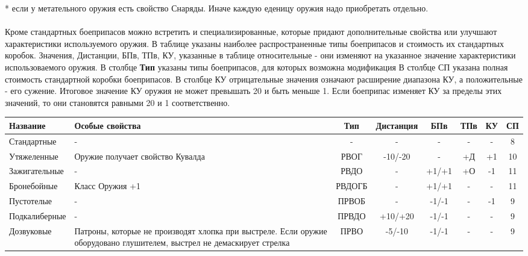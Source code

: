 * если у метательного оружия есть свойство Снаряды. Иначе каждую еденицу оружия надо приобретать отдельно.

\paragraph{} Кроме стандартных боеприпасов можно встретить и специализированные, которые придают дополнительные свойства или улучшают характеристики используемого оружия. В таблице указаны наиболее распространенные типы боеприпасов и стоимость их стандартных коробок.
\newline Значения, Дистанции, БПв, ТПв, КУ, указанные в таблице относительные - они изменяют на указанное значение характеристики использоваемого оружия.
\newline В столбце \textbf{Тип} указаны типы боеприпасов, для которых возможна модификация
\newline В столбце СП указана полная стоимость стандартной коробки боеприпасов.
\newline В столбце КУ отрицательные значения означают расширение диапазона КУ, а положительные - его сужение. Итоговое значение КУ оружия не может превышать 20 и быть меньше 1. Если боеприпас изменяет КУ за пределы этих значений, то они становятся равными 20 и 1 соответственно.

\begin{longtable}{|p{3cm}|p{2.5cm}|c||c|c|c|c||c|}\hline
Название & Особые свойства & Тип & Дистанция & БПв & ТПв & КУ & СП\\ \hline
Стандартные & - & - & - & - & - & - & 8\\ \hline
Утяжеленные & Оружие получает свойство Кувалда & РВОГ & -10/-20 & - & +Д & +1 & 10\\ \hline
Зажигательные & - & РВДО & - & +1/+1 & +О & -1 & 11\\ \hline
Бронебойные & Класс Оружия +1 & РВДОГБ & - & +1/+1 & - & - & 11\\ \hline
Пустотелые & - & ПРВОБ & - & -1/-1 & - & -1 & 9\\ \hline
Подкалиберные & - & ПРВДО & +10/+20 & -1/-1 & - & - & 9\\ \hline
Дозвуковые & Патроны, которые не производят хлопка при выстреле. Если оружие оборудовано глушителем, выстрел не демаскирует стрелка & ПРВО & -5/-10 & -1/-1 & - & - & 9\\ \hline
\end{longtable}
